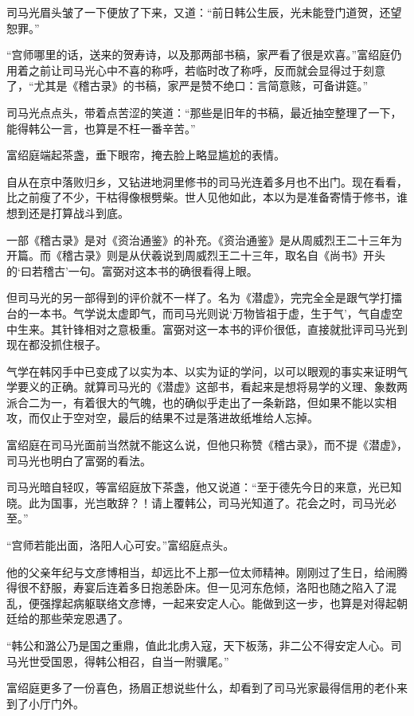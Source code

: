 司马光眉头皱了一下便放了下来，又道：“前日韩公生辰，光未能登门道贺，还望恕罪。” 

“宫师哪里的话，送来的贺寿诗，以及那两部书稿，家严看了很是欢喜。”富绍庭仍用着之前让司马光心中不喜的称呼，若临时改了称呼，反而就会显得过于刻意了，“尤其是《稽古录》的书稿，家严是赞不绝口：言简意赅，可备讲筵。” 

司马光点点头，带着点苦涩的笑道：“那些是旧年的书稿，最近抽空整理了一下，能得韩公一言，也算是不枉一番辛苦。” 

富绍庭端起茶盏，垂下眼帘，掩去脸上略显尴尬的表情。 

自从在京中落败归乡，又钻进地洞里修书的司马光连着多月也不出门。现在看看，比之前瘦了不少，干枯得像根劈柴。世人见他如此，本以为是准备寄情于修书，谁想到还是打算战斗到底。 

一部《稽古录》是对《资治通鉴》的补充。《资治通鉴》是从周威烈王二十三年为开篇。而《稽古录》则是从伏羲说到周威烈王二十三年，取名自《尚书》开头的‘曰若稽古’一句。富弼对这本书的确很看得上眼。 

但司马光的另一部得到的评价就不一样了。名为《潜虚》，完完全全是跟气学打擂台的一本书。气学说太虚即气，而司马光则说‘万物皆祖于虚，生于气’，气自虚空中生来。其针锋相对之意极重。富弼对这一本书的评价很低，直接就批评司马光到现在都没抓住根子。 

气学在韩冈手中已变成了以实为本、以实为证的学问，以可以眼观的事实来证明气学要义的正确。就算司马光的《潜虚》这部书，看起来是想将易学的义理、象数两派合二为一，有着很大的气魄，也的确似乎走出了一条新路，但如果不能以实相攻，而仅止于空对空，最后的结果不过是落进故纸堆给人忘掉。 

富绍庭在司马光面前当然就不能这么说，但他只称赞《稽古录》，而不提《潜虚》，司马光也明白了富弼的看法。 

司马光暗自轻叹，等富绍庭放下茶盏，他又说道：“至于德先今日的来意，光已知晓。此为国事，光岂敢辞？！请上覆韩公，司马光知道了。花会之时，司马光必至。” 

“宫师若能出面，洛阳人心可安。”富绍庭点头。 

他的父亲年纪与文彦博相当，却远比不上那一位太师精神。刚刚过了生日，给闹腾得很不舒服，寿宴后连着多日抱恙卧床。但一见河东危倾，洛阳也随之陷入了混乱，便强撑起病躯联络文彦博，一起来安定人心。能做到这一步，也算是对得起朝廷给的那些荣宠恩遇了。 

“韩公和潞公乃是国之重鼎，值此北虏入寇，天下板荡，非二公不得安定人心。司马光世受国恩，得韩公相召，自当一附骥尾。” 

富绍庭更多了一份喜色，扬眉正想说些什么，却看到了司马光家最得信用的老仆来到了小厅门外。 

